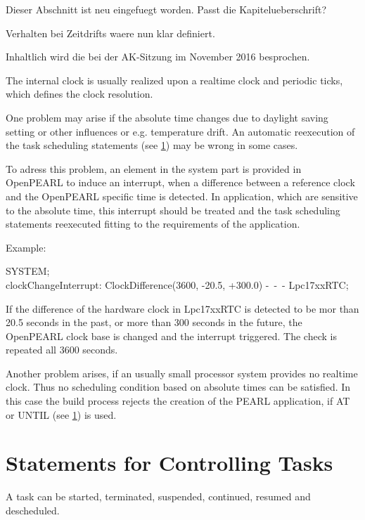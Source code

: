\begin{discuss}
Dieser Abschnitt ist neu eingefuegt worden.
Passt die Kapitelueberschrift?

Verhalten bei Zeitdrifts waere nun klar definiert.

Inhaltlich wird die bei der AK-Sitzung im November 2016 besprochen.

\begin{added}
The internal clock is usually realized upon a realtime clock and 
periodic ticks, which defines the clock resolution. 

One problem may arise if the absolute time changes due to 
daylight saving setting or other influences or e.g. temperature  drift.
An automatic reexecution of the task scheduling statements
 (see \ref{sec_tasking_statements})
may be wrong in some cases. 

To adress this problem, 
an element in the system part is provided in OpenPEARL
to induce an interrupt, when a difference between a reference clock and
the OpenPEARL specific time is detected. In application, which are sensitive
to the absolute time, this  interrupt should be treated and the task scheduling
statements reexecuted fitting to the requirements of the application.

Example:

SYSTEM;\\
\x clockChangeInterrupt: ClockDifference(3600, -20.5, +300.0) -\ -\ - Lpc17xxRTC;

If the difference of the hardware clock in Lpc17xxRTC is detected to be 
mor than 20.5 seconds in the past, or more than 300 seconds in the future,
the OpenPEARL clock base is changed and the interrupt triggered.
The check is repeated all 3600 seconds.

Another problem arises, if an usually small processor system provides no
realtime clock. Thus no scheduling condition based on absolute times 
 can be satisfied. In this case the build process rejects the creation
of the PEARL application, if AT or UNTIL
 (see \ref{sec_tasking_statements})
 is used.

\end{added}
\end{discuss}


\section{Statements for Controlling Tasks}    %
\label{sec_tasking_statements}

A task can be started, terminated, suspended, continued, resumed and
descheduled.

